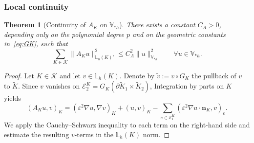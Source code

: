 \documentclass[a4paper,twoside,10pt]{article}
\newtheorem{theorem}{Theorem}[section]
\newcommand{\Vsh}{V_{\!\star \hspace*{-0.2mm}h}}
\newcommand{\AK}{{A_K}}
\newcommand{\LKh}{\mathbb{L}_h(K)}
\newcommand{\eps}{\varepsilon}
\newcommand{\inner}[1]{( #1 )}
\newcommand{\calE}{\mathcal{E}}
\newcommand{\calK}{\mathcal{K}}
\newcommand{\bn}{\mathbf{n}}
\numberwithin{equation}{section}
\renewcommand{\Vsh}{\mathbb{V}_{*h}}
\newcommand{\Kt}{\widetilde{K}}
\begin{document}
	\subsubsection{Local continuity} \label{sec:localcontinuity}
	\begin{theorem}[Continuity of $A_K$ on $\Vsh$] \label{thm:continuity-AK}
	There exists a constant $C_A>0$, depending only on the polynomial degree $p$ and on the geometric constants in~\eqref{eq:GK}, such that
	\begin{equation*}
	\sum_{K\in\calK} \|\AK u\|_{\LKh'}^2 \le C_A^2 \|u\|_{\Vsh}^2
	\qquad\forall u\in\Vsh.
	\end{equation*}
	\end{theorem}
	\begin{proof}
	Let $K\in\calK$ and let $v\in \LKh$. Denote by $\widetilde v:=v\circ G_K$ the pullback of $v$ to $\Kt$.
	Since $v$ vanishes on $\calE_2^K= G_K(\partial \Kt_1\times \Kt_2)$,
	Integration by parts on $K$ yields
	\begin{equation}\label{eq:cont-AK-ibp}
	\inner{A_Ku,v}_{K}
	=
	(\eps^2 \nabla u,\nabla v)_{K}
	+
	(u,v)_{K}
	-
	\sum_{e\in\calE^K_1}
	( \eps^2 \nabla u\cdot \bn_K,v)_{e}.
	\end{equation}
	We apply the Cauchy--Schwarz inequality to each term on the right-hand side and estimate the resulting 
	$v$-terms in the $\LKh$ norm.


\end{proof}
\end{document}
